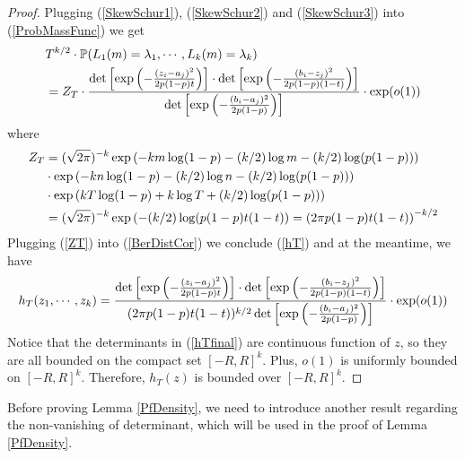 \begin{proof}
	Plugging (\ref{SkewSchur1}), (\ref{SkewSchur2}) and (\ref{SkewSchur3}) into (\ref{ProbMassFunc}) we get
	\begin{equation}{\label{BerDistCor}}
		\begin{split}
			& T^{k/2}\cdot \mathbb{P}(L_{1}(m)=\lambda_1,\cdots,L_k(m)=\lambda_k)\\
			& =Z_{T}\cdot \frac{\det\left[\exp\left(-\frac{(z_{i}-a_j)^2}{2p(1-p)t}\right)\right]\cdot\det\left[\exp\left(-\frac{(b_{i}-z_j)^2}{2p(1-p)(1-t)}\right)\right]}{\det\left[\exp\left(-\frac{(b_{i}-a_j)^2}{2p(1-p)}\right)\right]}\cdot \exp(o(1))
		\end{split}
	\end{equation}
	where 
	\begin{equation}{\label{ZT}}
		\begin{split}
			Z_{T}&=(\sqrt{2\pi})^{-k}\exp\left(-km\log(1-p)-(k/2)\log m-(k/2)\log(p(1-p))\right)\\
			&\cdot \exp\left(-kn\log(1-p)-(k/2)\log n-(k/2)\log(p(1-p))\right)\\
			& \cdot \exp\left(kT\log(1-p)+k\log T+(k/2)\log(p(1-p))\right)\\
			&=(\sqrt{2\pi})^{-k}\exp\left(-(k/2)\log(p(1-p)t(1-t) \right)=\left(2\pi p(1-p)t(1-t)\right)^{-k/2}
		\end{split}
	\end{equation}
	Plugging (\ref{ZT}) into (\ref{BerDistCor}) we conclude (\ref{hT}) and at the meantime, we have
	\begin{equation}{\label{hTfinal}}
		\begin{split}
			h_{T}(z_1,\cdots,z_k)=\frac{\det\left[\exp\left(-\frac{(z_{i}-a_j)^2}{2p(1-p)t}\right)\right]\cdot\det\left[\exp\left(-\frac{(b_{i}-z_j)^2}{2p(1-p)(1-t)}\right)\right]}{(2\pi p(1-p)t(1-t))^{k/2}\det\left[\exp\left(-\frac{(b_{i}-a_j)^2}{2p(1-p)}\right)\right]}\cdot \exp(o(1))
		\end{split}
	\end{equation}
	Notice that the determinants in (\ref{hTfinal}) are continuous function of $z$, so they are all bounded on the compact set $[-R,R]^{k}$. Plus, $o(1)$ is uniformly bounded on $[-R,R]^{k}$. Therefore, $h_{T}(z)$ is bounded over $[-R,R]^k$.
\end{proof}
Before proving Lemma \ref{PfDensity}, we need to introduce another result regarding the non-vanishing of determinant, which will be used in the proof of Lemma \ref{PfDensity}.

